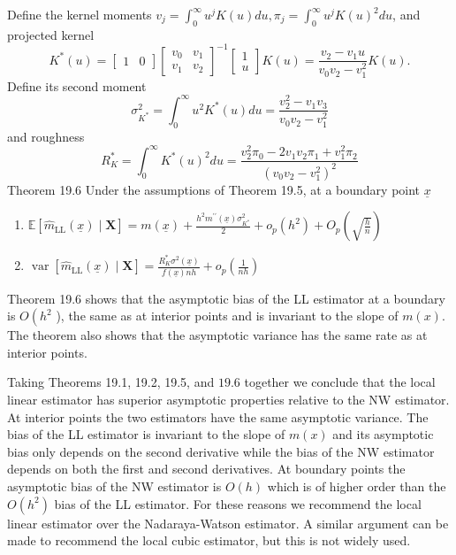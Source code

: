 \documentclass[10pt]{article}
\begin{document}
Define the kernel moments $v_{j}=\int_{0}^{\infty} u^{j} K(u) d u, \pi_{j}=\int_{0}^{\infty} u^{j} K(u)^{2} d u$, and projected kernel
$$
K^{*}(u)=\left[\begin{array}{ll}
1 & 0
\end{array}\right]\left[\begin{array}{ll}
v_{0} & v_{1} \\
v_{1} & v_{2}
\end{array}\right]^{-1}\left[\begin{array}{c}
1 \\
u
\end{array}\right] K(u)=\frac{v_{2}-v_{1} u}{v_{0} v_{2}-v_{1}^{2}} K(u) .
$$
Define its second moment
$$
\sigma_{K^{*}}^{2}=\int_{0}^{\infty} u^{2} K^{*}(u) d u=\frac{v_{2}^{2}-v_{1} v_{3}}{v_{0} v_{2}-v_{1}^{2}}
$$
and roughness
$$
R_{K}^{*}=\int_{0}^{\infty} K^{*}(u)^{2} d u=\frac{v_{2}^{2} \pi_{0}-2 v_{1} v_{2} \pi_{1}+v_{1}^{2} \pi_{2}}{\left(v_{0} v_{2}-v_{1}^{2}\right)^{2}}
$$
Theorem 19.6 Under the assumptions of Theorem 19.5, at a boundary point $\underline{x}$

\begin{enumerate}
  \item $\mathbb{E}\left[\hat{m}_{\mathrm{LL}}(\underline{x}) \mid \boldsymbol{X}\right]=m(\underline{x})+\frac{h^{2} m^{\prime \prime}(\underline{x}) \sigma_{K^{*}}^{2}}{2}+o_{p}\left(h^{2}\right)+O_{p}\left(\sqrt{\frac{h}{n}}\right)$

  \item $\operatorname{var}\left[\widehat{m}_{\mathrm{LL}}(\underline{x}) \mid \boldsymbol{X}\right]=\frac{R_{K}^{*} \sigma^{2}(\underline{x})}{f(\underline{x}) n h}+o_{p}\left(\frac{1}{n h}\right)$

\end{enumerate}
Theorem 19.6 shows that the asymptotic bias of the LL estimator at a boundary is $O\left(h^{2}\right.$ ), the same as at interior points and is invariant to the slope of $m(x)$. The theorem also shows that the asymptotic variance has the same rate as at interior points.

Taking Theorems 19.1, 19.2, 19.5, and $19.6$ together we conclude that the local linear estimator has superior asymptotic properties relative to the NW estimator. At interior points the two estimators have the same asymptotic variance. The bias of the LL estimator is invariant to the slope of $m(x)$ and its asymptotic bias only depends on the second derivative while the bias of the NW estimator depends on both the first and second derivatives. At boundary points the asymptotic bias of the NW estimator is $O(h)$ which is of higher order than the $O\left(h^{2}\right)$ bias of the LL estimator. For these reasons we recommend the local linear estimator over the Nadaraya-Watson estimator. A similar argument can be made to recommend the local cubic estimator, but this is not widely used.
\end{document}
